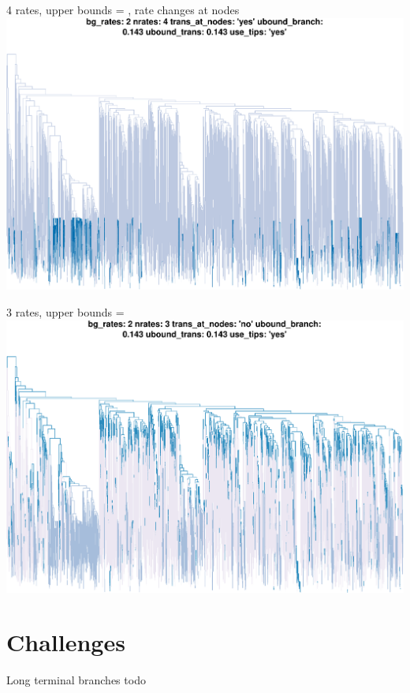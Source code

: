 \documentclass{beamer}
\begin{document}
\begin{frame}{4 rates, upper bounds = , rate changes at nodes}
    \includegraphics[width=\textwidth, trim=0 0 0 0.8in, clip=true]{pcbr2}
\end{frame}

\begin{frame}{3 rates, upper bounds = }
    \includegraphics[width=\textwidth, trim=0 0 0 0.8in, clip=true]{pcbr1}
\end{frame}

\section{Challenges}

\begin{frame}{Long terminal branches}
    todo
\end{frame}
\end{document}
